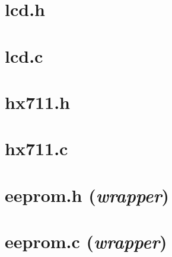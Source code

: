 \begin{appendices}
{	\section*{lcd.h}
	\label{anexo-lcd-h}
	
	\newpage
	\section*{lcd.c}
	\label{anexo-lcd-c}
	
	\newpage
	\section*{hx711.h}
	\label{anexo-hx711-h}
	
	\newpage
	\section*{hx711.c}
	\label{anexo-hx711-c}
	
	\newpage
	\section*{eeprom.h (\textit{wrapper})}
	\label{anexo-eeprom-h}
	
	\newpage
	\section*{eeprom.c (\textit{wrapper})}
	\label{anexo-eeprom-c}
	
	}
	\restoregeometry
	\newpage
	
	\label{anexo-definition-1}
	\newpage
	
	\label{anexo-physics-1}
\end{appendices}
